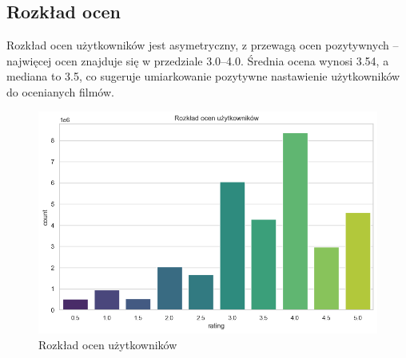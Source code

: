 \documentclass{article}
\begin{document}
\subsection{Rozkład ocen}
Rozkład ocen użytkowników jest asymetryczny, z przewagą ocen pozytywnych – najwięcej ocen znajduje się w przedziale 3.0–4.0. Średnia ocena wynosi 3.54, a mediana to 3.5, co sugeruje umiarkowanie pozytywne nastawienie użytkowników do ocenianych filmów.
\begin{figure}[H]
\centering
\includegraphics[width=1\textwidth]{pictures/oceny_rozklad.png}
\caption{Rozkład ocen użytkowników}
\label{fig:oceny_rozklad}
\end{figure}
\end{document}
